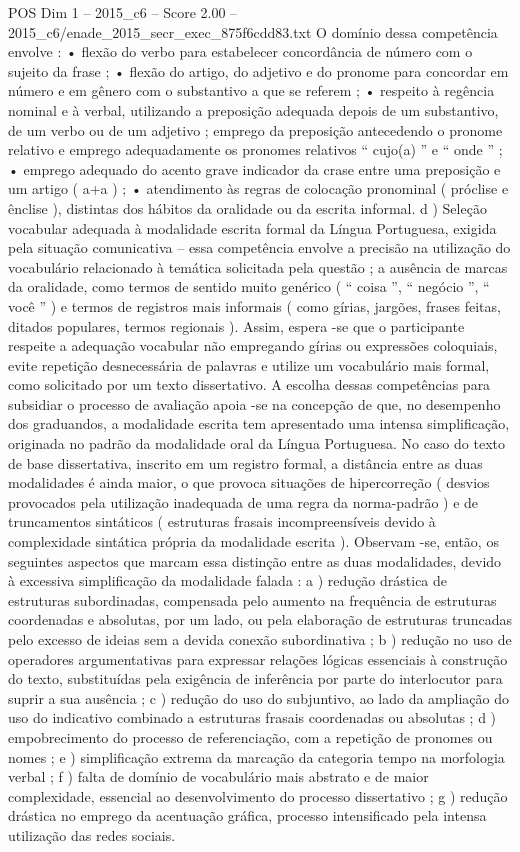 \begin{textsample}{POS Dim 1 – 2015\_c6 – Score 2.00 – 2015\_c6/enade\_2015\_secr\_exec\_875f6cdd83.txt}
O domínio dessa competência envolve : • flexão do verbo para estabelecer concordância de número com o sujeito da frase ; • flexão do artigo, do adjetivo e do pronome para concordar em número e em gênero com o substantivo a que se referem ; • respeito à regência nominal e à verbal, utilizando a preposição adequada depois de um substantivo, de um verbo ou de um adjetivo ; emprego da preposição antecedendo o pronome relativo e emprego adequadamente os pronomes relativos “ cujo(a) ” e “ onde ” ; • emprego adequado do acento grave indicador da crase entre uma preposição e um artigo ( a+a ) ; • atendimento às regras de colocação pronominal ( próclise e ênclise ), distintas dos hábitos da oralidade ou da escrita informal. d ) Seleção vocabular adequada à modalidade escrita formal da Língua Portuguesa, exigida pela situação comunicativa – essa competência envolve a precisão na utilização do vocabulário relacionado à temática solicitada pela questão ; a ausência de marcas da oralidade, como termos de sentido muito genérico ( “ coisa ”, “ negócio ”, “ você ” ) e termos de registros mais informais ( como gírias, jargões, frases feitas, ditados populares, termos regionais ).
Assim, espera -se que o participante respeite a adequação vocabular não empregando gírias ou expressões coloquiais, evite repetição desnecessária de palavras e utilize um vocabulário mais formal, como solicitado por um texto dissertativo.
A escolha dessas competências para subsidiar o processo de avaliação apoia -se na concepção de que, no desempenho dos graduandos, a modalidade escrita tem apresentado uma intensa simplificação, originada no padrão da modalidade oral da Língua Portuguesa.
No caso do texto de base dissertativa, inscrito em um registro formal, a distância entre as duas modalidades é ainda maior, o que provoca situações de hipercorreção ( desvios provocados pela utilização inadequada de uma regra da norma-padrão ) e de truncamentos sintáticos ( estruturas frasais incompreensíveis devido à complexidade sintática própria da modalidade escrita ).
Observam -se, então, os seguintes aspectos que marcam essa distinção entre as duas modalidades, devido à excessiva simplificação da modalidade falada : a ) redução drástica de estruturas subordinadas, compensada pelo aumento na frequência de estruturas coordenadas e absolutas, por um lado, ou pela elaboração de estruturas truncadas pelo excesso de ideias sem a devida conexão subordinativa ; b ) redução no uso de operadores argumentativas para expressar relações lógicas essenciais à construção do texto, substituídas pela exigência de inferência por parte do interlocutor para suprir a sua ausência ; c ) redução do uso do subjuntivo, ao lado da ampliação do uso do indicativo combinado a estruturas frasais coordenadas ou absolutas ; d ) empobrecimento do processo de referenciação, com a repetição de pronomes ou nomes ; e ) simplificação extrema da marcação da categoria tempo na morfologia verbal ; f ) falta de domínio de vocabulário mais abstrato e de maior complexidade, essencial ao desenvolvimento do processo dissertativo ; g ) redução drástica no emprego da acentuação gráfica, processo intensificado pela intensa utilização das redes sociais.

\end{textsample}
